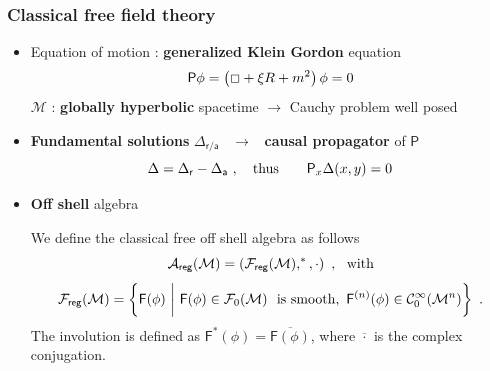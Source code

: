 \documentclass[9pt]{beamer}
\newcommand{\reg}{\mathsf{reg}}
\newcommand{\Acal}{\mathcal{A}}
\newcommand{\Ccal}{\mathcal{C}}
\newcommand{\Fcal}{\mathcal{F}}
\newcommand{\Mcal}{\mathcal{M}}
\newcommand{\Fsf}{\mathsf{F}}
\newcommand{\Psf}{\mathsf{P}}
\newcommand{\asf}{\mathsf{a}}
\newcommand{\rsf}{\mathsf{r}}
\begin{document}
\begin{frame}

\frametitle{Classical free field theory}

\vfill

\begin{itemize}

\item Equation of motion : \textbf{generalized Klein Gordon} equation
%
\vspace*{-8pt}
\begin{equation*} 
\Psf \phi = \left( \Box + \xi R + m^2 \right) \phi = 0
\vspace*{-8pt}
\end{equation*}
%
$\Mcal$ : \textbf{globally hyperbolic} spacetime $\to$ Cauchy problem well posed
\vspace*{-8pt}

\item \textbf{Fundamental solutions} $\Delta_{\rsf / \asf}$ \ $\to$ \ \textbf{causal propagator} of $\Psf$
\vspace*{-8pt}
%
\begin{equation*}
\Delta = \Delta_\rsf - \Delta_\asf \ , \quad \mbox{thus} \qquad \Psf_x \Delta(x,y) = 0
\vspace*{-8pt}
\end{equation*}

\item \textbf{Off shell} algebra

\begin{definition}
\vspace*{-5pt}
We define the classical free off shell algebra as follows
%
\vspace*{-5pt}
\begin{equation*}
\Acal_\reg(\Mcal) = \left(\Fcal_\reg(\Mcal), ^\ast , \cdot\right) \ , \ \ \mbox{with}
\vspace*{-5pt}
\end{equation*}
%
\begin{equation*}
\Fcal_{\mathsf{reg}}(\Mcal) = \left\{ \Fsf(\phi) \ \bigg| \ \Fsf(\phi) \in \Fcal_0(\Mcal) \ \mbox{ is smooth}, \ \Fsf^{(n)}(\phi) \in \Ccal^\infty_0(\Mcal^{n}) \right\} \ .
\vspace*{-5pt}
\end{equation*}
%
The involution is defined as $\Fsf^\ast(\phi) = \overline{\Fsf(\phi)}$, where $\overline{\cdot}$ is the complex conjugation.
%
\end{definition}

\end{itemize}

\end{frame}
\end{document}
